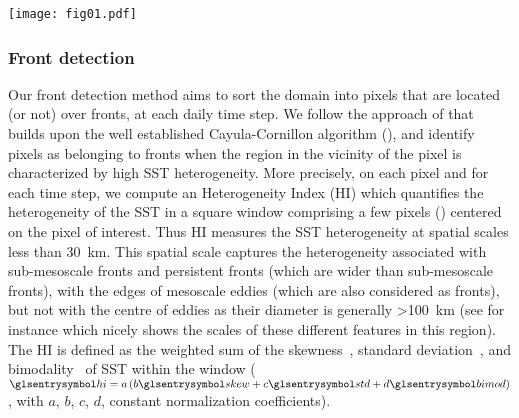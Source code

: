 \begin{figure*}
  \centering
  \texttt{[image: fig01.pdf]}
  \caption[Delimitation of biomes]{
    Delimitation of the three biomes in the open ocean Gulf Stream extension region: the Permanent Subtropical Biome (PSB, south of the dashed line at ), the Seasonal Subtropical Biome (SSB, between  and the meandering Gulf Stream northern wall on that day marked with the black contour), and the sub-Polar Biome (PB, north of the Gulf Stream northern wall).
    (a)~SST and (b)~ snapshots on the 22 April 2007 (with data masked by clouds in white). The red line follows the \qty{1500}{\m} isobath.
    Data on the continental shelf (\qty{<1500}{\m}) is not considered here and have been masked.
    (c)~SST and (d)~ distribution within each biome for the same day (PB:~blue, SSB:~yellow, PSB:~red).
    The black line in~(c) shows the SST threshold value detected to delimit the Gulf Stream northern wall (see methods section).
  }%
  \label{fig:zone-separation}
\end{figure*}

\subsubsection{Front detection}

Our front detection method aims to sort the domain into pixels that are located (or not) over fronts, at each daily time step.
We follow the approach of \textcite{liu_2016} that builds upon the well established Cayula-Cornillon algorithm (\cite{cayula_1992, belkin_2009}), and identify pixels as belonging to fronts when the region in the vicinity of the pixel is characterized by high SST heterogeneity.
More precisely, on each pixel and for each time step, we compute an Heterogeneity Index (HI) which quantifies the heterogeneity of the SST in a square window comprising a few pixels () centered on the pixel of interest.
Thus HI measures the SST heterogeneity at spatial scales less than \qty{30}{\km}.
This spatial scale captures the heterogeneity associated with sub-mesoscale fronts and persistent fronts (which are wider than sub-mesoscale fronts), with the edges of mesoscale eddies (which are also considered as fronts), but not with the centre of eddies as their diameter is generally \qty{>100}{\km} (see for instance \textcite{contreras_2023} which nicely shows the scales of these different features in this region).
The HI is defined as the weighted sum of the skewness~, standard deviation~, and bimodality~ of SST within the window (\(\am{hi} = a \paren{ b \am{skew} + c \am{std} + d \am{bimod} }\), with \(a\), \(b\), \(c\), \(d\), constant normalization coefficients).

